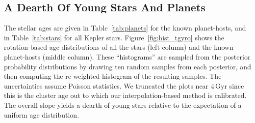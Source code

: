 \documentclass[11pt,twocolumn,tighten]{aastex63}
\begin{document}
\begin{figure*}[!t]
  \begin{center}
    \leavevmode

	\vspace{-0.35cm}
  \end{center}
  \vspace{-0.66cm}
  \caption{{\bf Kepler's demographic cliff,} visible in the
  rotation-derived ages of stars (left) and planet hosts (middle) in
  the Kepler field.  The top row shows all stars with
  temperatures of 3800--6200\,K for which we calculated rotation-based
  ages.  Opaque lines impose quality cuts on 
  binarity, crowding, and the star's evolutionary state; transparent lines do not.
  The bottom
  shows stars with temperatures of 4400--5400\,K, which have
  more precise ages due to their fast spin-down.
  The statistical uncertainty for a mean
  individual star at 1, 2, and 3\,Gyr is shown, and is identical
  across each row.  Finally, the right panel compares the
  rotation-derived ages against star formation histories
  derived using CMD fitting (dashed and dotted lines).  Completeness in Kepler's
  $P$$_{\rm rot}$ detection sensitivity is near unity until
  $t$$\lesssim$3\,Gyr \citep{2022ApJ...937...94M}.
  \label{fig:hist_tgyro}
  }
\end{figure*}


\subsection{A Dearth Of Young Stars And Planets}

The stellar ages 
are given in Table~\ref{tab:planets} for the known planet-hosts,
and in Table~\ref{tab:stars} for all Kepler stars.  Figure~\ref{fig:hist_tgyro} shows the rotation-based
age distributions of all the stars (left column) and the known
planet-hosts (middle column).  These ``histograms'' are sampled from
the posterior probability distributions by drawing ten random samples
from each posterior, and then computing the re-weighted
histogram of the resulting samples.  The uncertainties assume Poisson
statistics.  We truncated the plots near $4$\,Gyr since this is the
cluster age out to which our interpolation-based method is calibrated.
The overall slope yields a dearth of young stars relative to the expectation
of a uniform age distribution.
\end{document}
